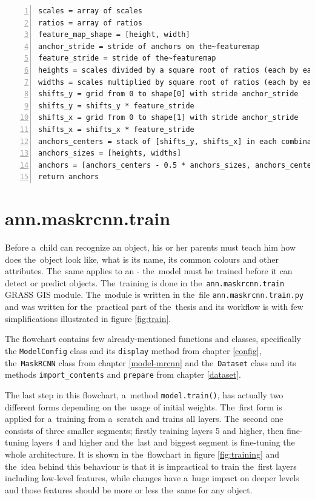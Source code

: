 {\scriptsize
\begin{lstlisting}[style=python, caption={generate\_anchors}, captionpos=b, 
label=code:anchors, deletekeywords={range, from, map, in},
backgroundcolor = \color{light-gray}, numbers=left, breaklines=true]
scales = array of scales
ratios = array of ratios
feature_map_shape = [height, width]
anchor_stride = stride of anchors on the~featuremap
feature_stride = stride of the~featuremap
heights = scales divided by a square root of ratios (each by each)
widths = scales multiplied by square root of ratios (each by each)
shifts_y = grid from 0 to shape[0] with stride anchor_stride
shifts_y = shifts_y * feature_stride
shifts_x = grid from 0 to shape[1] with stride anchor_stride
shifts_x = shifts_x * feature_stride
anchors_centers = stack of [shifts_y, shifts_x] in each combination
anchors_sizes = [heights, widths]
anchors = [anchors_centers - 0.5 * anchors_sizes, anchors_centers + 0.5 * anchors_sizes]
return anchors
\end{lstlisting}}

\section{ann.maskrcnn.train}
\label{train-module}

Before a~child can recognize an object, his or her parents must teach him how 
does the~object look like, what is its name, its common colours and other 
attributes. The~same applies to an  - the~model must be trained before it 
can detect or predict objects. The~training is done in the~\verb|ann.maskrcnn.train|
GRASS GIS module. The~module is written in the~file 
\verb|ann.maskrcnn.train.py| and was written for the~practical part of
the~thesis and its workflow is with few simplifications illustrated in figure 
\ref{fig:train}.

The flowchart contains few already-mentioned functions and classes, specifically 
the \verb|ModelConfig| class and its \verb|display| method from chapter 
\ref{config}, the~\verb|MaskRCNN| class from chapter \ref{model-mrcnn} and
the~\verb|Dataset| class and its methods \verb|import_contents| and \verb|prepare| 
from chapter \ref{dataset}.

The last step in this flowchart, a~method \verb|model.train()|, has actually two 
different forms depending on the~usage of initial weights. The~first form is 
applied for a~training from a~scratch and trains all layers. The~second one 
consists of three smaller segments; firstly training layers 5 and higher, then 
fine-tuning layers 4 and higher and the~last and biggest segment is fine-tuning 
the whole architecture. It is shown in the~flowchart in figure 
\ref{fig:training} and the~idea behind this behaviour is that it is impractical 
to train the~first layers including low-level features, while changes have
a~huge impact on deeper levels and those features should be more or less the~same 
for any object.

